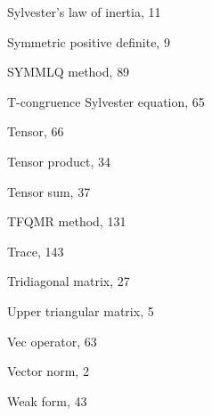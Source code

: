 \begin{description}
{Sylvester’s law of inertia}, {11}\par

{Symmetric positive definite}, {9}\par

{SYMMLQ method}, {89}\par

\item[T]
{T-congruence Sylvester equation}, {65}\par

{Tensor}, {66}\par

{Tensor product}, {34}\par

{Tensor sum}, {37}\par

{TFQMR method}, {131}\par

{Trace}, {143}\par

{Tridiagonal matrix}, {27}\par

\item[U]
{Upper triangular matrix}, {5}\par

\item[V]
{Vec operator}, {63}\par

{Vector norm}, {2}\par

\item[W]
{Weak form}, {43}\par

\end{description}
